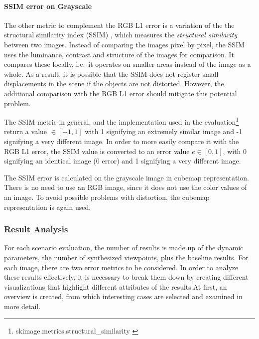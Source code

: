 \paragraph{SSIM error on Grayscale}
The other metric to complement the RGB L1 error is a variation of the the structural similarity index (SSIM) \cite{ssim}, which measures the \emph{structural similarity} between two images. Instead of comparing the images pixel by pixel, the SSIM uses the luminance, contrast and structure of the images for comparison. It compares these locally, i.e.\ it operates on smaller areas instead of the image as a whole. As a result, it is possible that the SSIM does not register small displacements in the scene if the objects are not distorted. However, the additional comparison with the RGB L1 error should mitigate this potential problem.

The SSIM metric in general, and the implementation used in the evaluation\footnote{skimage.metrics.structural\_similarity \cite{skimage}} return a value $\in [-1, 1]$ with 1 signifying an extremely similar image and -1 signifying a very different image. In order to more easily compare it with the RGB L1 error, the SSIM value is converted to an error value $ e \in [0,1]$, with 0 signifying an identical image (0 error) and 1 signifying a very different image.

The SSIM error is calculated on the grayscale image in cubemap representation. There is no need to use an RGB image, since it does not use the color values of an image. To avoid possible problems with distortion, the cubemap representation is again used.

\subsubsection{Result Analysis}
For each scenario evaluation, the number of results is made up of the dynamic parameters, the number of synthesized viewpoints, plus the baseline results. For each image, there are two error metrics to be considered.
In order to analyze these results effectively, it is necessary to break them down by creating different visualizations that highlight different attributes of the results.At first, an overview is created, from which interesting cases are selected and examined in more detail.

